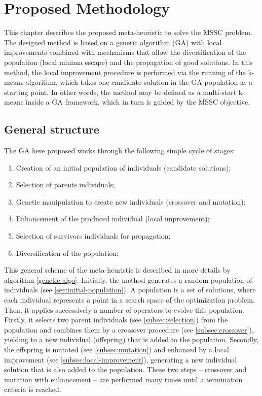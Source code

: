 \chapter{Proposed Methodology}
\label{chap:methodology}
This chapter describes the proposed meta-heuristic to solve the MSSC problem. The designed method is based on a genetic algorithm (GA) with local improvements combined with mechanisms that allow the diversification of the population (local minima escape) and the propagation of good solutions. In this method, the local improvement procedure is performed via the running of the k-means algorithm, which takes one candidate solution in the GA population as a starting point. In other words, the method may be defined as a multi-start k-means inside a GA framework, which in turn is guided by the MSSC objective. 

\section{General structure}
\label{sec:general-structure}
The GA here proposed works through the following simple cycle of stages:

\begin{enumerate}
	\item Creation of an initial population of individuals (candidate solutions);

	\item Selection of parents individuals;

	\item Genetic manipulation to create new individuals (crossover and mutation);
	
	\item Enhancement of the produced individual (local improvement);
	
	\item Selection of survivors individuals for propagation;
	
	\item Diversification of the population;	
\end{enumerate}

This general scheme of the meta-heuristic is described in more details by algorithm \ref{genetic-algo}. Initially, the method generates a random population of individuals (see \ref{sec:initial-population}). A population is a set of solutions, where each individual represents a point in a search space of the optimization problem. Then, it applies successively a number of operators to evolve this population. Firstly, it selects two parent individuals (see \ref{subsec:selection}) from the population and combines them by a crossover procedure (see \ref{subsec:crossover}), yielding to a new individual (offspring) that is added to the population. Secondly, the offspring is mutated (see \ref{subsec:mutation}) and enhanced by a local improvement (see \ref{subsec:local-improvement}), generating a new individual solution that is also added to the population. These two steps -- crossover and mutation with enhancement -- are performed many times until a termination criteria is reached.

